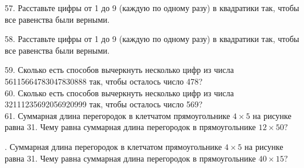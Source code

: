 \documentclass[12pt]{article}
\begin{document}
57. Расставьте цифры от 1 до 9 (каждую по одному разу) в квадратики так, чтобы все равенства были верными.
\begin{center}
\begin{figure}[ht!]
\end{figure}
\end{center}
58. Расставьте цифры от 1 до 9 (каждую по одному разу) в квадратики так, чтобы все равенства были верными.
\begin{center}
\begin{figure}[ht!]
\end{figure}
\end{center}
59. Сколько есть способов вычеркнуть несколько цифр из числа 56115664783047830888 так, чтобы осталось число 478?\\
60. Сколько есть способов вычеркнуть несколько цифр из числа 32111235692056920999 так, чтобы осталось число 569?\\
61. Суммарная длина перегородок в клетчатом прямоугольнике $4\times5$ на рисунке равна 31. Чему равна суммарная длина перегородок в прямоугольнике $12\times50?$
\begin{center}
\begin{figure}[ht!]
\end{figure}
\end{center}
\newpage
{}. Суммарная длина перегородок в клетчатом прямоугольнике $4\times5$ на рисунке равна 31. Чему равна суммарная длина перегородок в прямоугольнике $40\times15?$
\begin{center}
\begin{figure}[ht!]
\end{figure}
\end{center}
\end{document}
